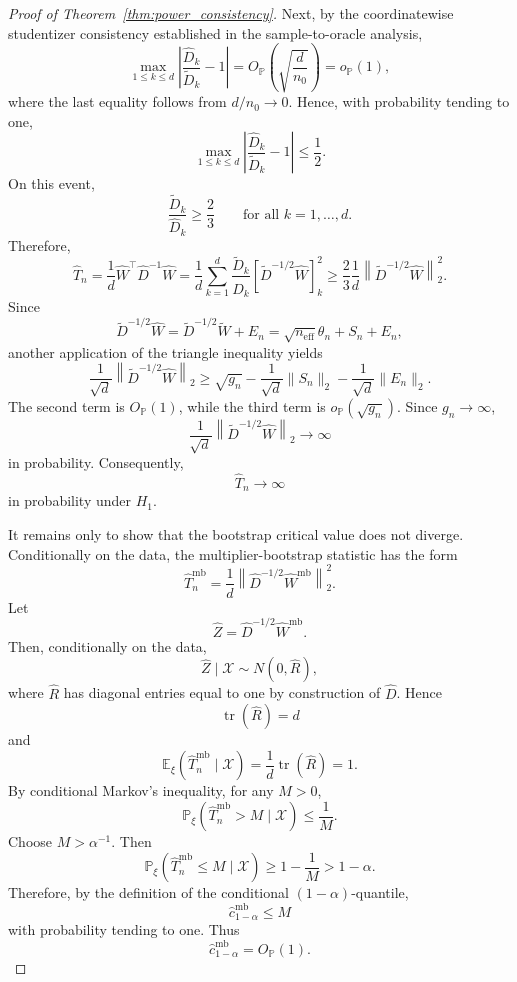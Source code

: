 \documentclass[
  12pt]{article}
\theoremstyle{plain}
\theoremstyle{definition}
\theoremstyle{remark}
\begin{document}
\begin{proof}[Proof of Theorem~\ref{thm:power_consistency}]
Next, by the coordinatewise studentizer consistency established in the
sample-to-oracle analysis,
\[
\max_{1\le k\le d}
\left|
\frac{\widehat D_k}{\widetilde D_k}-1
\right|
=
O_{\mathbb P}
\left(
\sqrt{\frac{d}{n_0}}
\right)
=
o_{\mathbb P}(1),
\]
where the last equality follows from \(d/n_0\to0\).  Hence, with probability
tending to one,
\[
\max_{1\le k\le d}
\left|
\frac{\widehat D_k}{\widetilde D_k}-1
\right|
\le \frac12.
\]
On this event,
\[
\frac{\widetilde D_k}{\widehat D_k}\ge \frac23
\qquad
\text{for all } k=1,\ldots,d.
\]
Therefore,
\[
\widehat T_n
=
\frac1d
\widehat W^\top \widehat D^{-1}\widehat W
=
\frac1d
\sum_{k=1}^d
\frac{\widetilde D_k}{\widehat D_k}
\left[
\widetilde D^{-1/2}\widehat W
\right]_k^2
\ge
\frac23
\frac1d
\left\|
\widetilde D^{-1/2}\widehat W
\right\|_2^2.
\]
Since
\[
\widetilde D^{-1/2}\widehat W
=
\widetilde D^{-1/2}\widetilde W+E_n
=
\sqrt{n_{\mathrm{eff}}}\theta_n+S_n+E_n,
\]
another application of the triangle inequality yields
\[
\frac1{\sqrt d}
\left\|
\widetilde D^{-1/2}\widehat W
\right\|_2
\ge
\sqrt{g_n}
-
\frac1{\sqrt d}\|S_n\|_2
-
\frac1{\sqrt d}\|E_n\|_2.
\]
The second term is \(O_{\mathbb P}(1)\), while the third term is
\(o_{\mathbb P}(\sqrt{g_n})\).  Since \(g_n\to\infty\),
\[
\frac1{\sqrt d}
\left\|
\widetilde D^{-1/2}\widehat W
\right\|_2
\to\infty
\]
in probability.  Consequently,
\[
\widehat T_n\to\infty
\]
in probability under \(H_1\).

It remains only to show that the bootstrap critical value does not diverge.
Conditionally on the data, the multiplier-bootstrap statistic has the form
\[
\widehat T_n^{\mathrm{mb}}
=
\frac1d
\left\|
\widehat D^{-1/2}\widehat W^{\mathrm{mb}}
\right\|_2^2.
\]
Let
\[
\widehat Z
=
\widehat D^{-1/2}\widehat W^{\mathrm{mb}}.
\]
Then, conditionally on the data,
\[
\widehat Z\mid\mathcal X\sim N(0,\widehat R),
\]
where \(\widehat R\) has diagonal entries equal to one by construction of
\(\widehat D\).  Hence
\[
\operatorname{tr}(\widehat R)=d
\]
and
\[
\mathbb E_\xi
\left(
\widehat T_n^{\mathrm{mb}}\mid\mathcal X
\right)
=
\frac1d\operatorname{tr}(\widehat R)
=
1.
\]
By conditional Markov's inequality, for any \(M>0\),
\[
\mathbb P_\xi
\left(
\widehat T_n^{\mathrm{mb}}>M
\mid\mathcal X
\right)
\le
\frac1M.
\]
Choose \(M>\alpha^{-1}\).  Then
\[
\mathbb P_\xi
\left(
\widehat T_n^{\mathrm{mb}}\le M
\mid\mathcal X
\right)
\ge
1-\frac1M
>
1-\alpha.
\]
Therefore, by the definition of the conditional \((1-\alpha)\)-quantile,
\[
\widehat c_{1-\alpha}^{\mathrm{mb}}\le M
\]
with probability tending to one.  Thus
\[
\widehat c_{1-\alpha}^{\mathrm{mb}}=O_{\mathbb P}(1).
\]


\end{proof}
\end{document}
